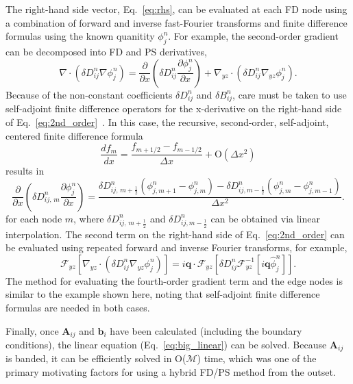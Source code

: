 \documentclass[journal=mamobx,manuscript=suppinfo]{achemso}
\begin{document}
The right-hand side vector, Eq.~\ref{eq:rhs}, can be evaluated at each FD node using a combination of forward and inverse fast-Fourier transforms and finite difference formulas using the known quanitity $\phi_{j}^{n}$.
For example, the second-order gradient can be decomposed into FD and PS derivatives,
\begin{equation} \label{eq:2nd_order}
\nabla \cdot ( \delta D_{ij}^{n} \nabla \phi_{j}^{n} )
  =  \frac{\partial}{\partial x} \left ( \delta D_{ij}^{n} \frac{\partial \phi_{j}^{n}}{\partial x} \right )
     + \nabla_{yz} \cdot ( \delta D_{ij}^{n} \nabla_{yz} \phi_{j}^{n}) \mathrm{.}
\end{equation}
Because of the non-constant coefficients ${\delta D}_{ij}^{n}$ and ${\delta B}_{ij}^{n}$, care must be taken to use self-adjoint finite difference operators for the x-derivative on the right-hand side of Eq.~\ref{eq:2nd_order}~\cite{FordVersypt2014}.
In this case, the recursive, second-order, self-adjoint, centered finite difference formula
\begin{equation}
  \frac{d f_{m}}{d x} = \frac{f_{m+1/2}-f_{m-1/2}}{\Delta x} + \textrm{O}(\Delta x^{2})
\end{equation}
results in
\begin{equation}
  \frac{\partial}{\partial x} \left ( \delta D_{ij, \, m}^{n} \frac{\partial \phi_{j}^{n}}{\partial x} \right )
     =  \frac{\delta D_{ij, \,m+\frac{1}{2}}^{n} (\phi_{j, m+1}^{n} - \phi_{j,m}^{n}) - \delta D_{ij, m-\frac{1}{2}}^{n} (\phi_{j, m}^{n} - \phi_{j,m-1}^{n})}{\Delta x^{2}} \mathrm{.}
\end{equation}
for each node $m$, where $\delta D_{ij, \,m+\frac{1}{2}}^{n}$ and $\delta D_{ij, m-\frac{1}{2}}^{n}$ can be obtained via linear interpolation.
The second term on the right-hand side of Eq.~\ref{eq:2nd_order} can be evaluated using repeated forward and inverse Fourier transforms, for example,
\begin{equation}
  \mathcal{F}_{yz} [ \nabla_{yz} \cdot ( \delta D_{ij}^{n} \nabla_{yz} \phi_{j}^{n}) ] = 
    i \bm{q} \cdot \mathcal{F}_{yz}\left [ \delta D_{ij}^{n} \mathcal{F}_{yz}^{-1}[i \bm{q} \hat{\phi}_{j}^{n}]  \right ] \mathrm{.}
\end{equation}
The method for evaluating the fourth-order gradient term and the edge nodes is similar to the example shown here, noting that self-adjoint finite difference formulas are needed in both cases.

Finally, once $\bm{A}_{ij}$ and $\bm{b}_{i}$ have been calculated (including the boundary conditions), the linear equation (Eq.~\ref{eq:big_linear}) can be solved.
Because $\bm{A}_{ij}$ is banded, it can be efficiently solved in O($\mathcal{M}$) time, which was one of the primary motivating factors for using a hybrid FD/PS method from the outset.
\end{document}
